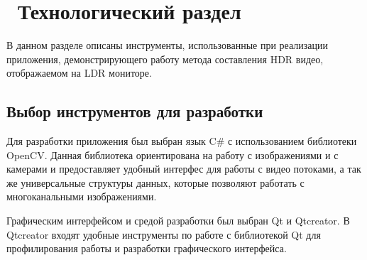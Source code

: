 \chapter{ Технологический раздел}
\label{cha:impl}

В данном разделе описаны инструменты, использованные при реализации приложения, демонстрирующего работу метода составления HDR видео, отображаемом на LDR мониторе.

\section{ Выбор инструментов для разработки}

Для разработки приложения был выбран язык C\# с использованием библиотеки OpenCV. Данная библиотека ориентирована на работу с изображениями и с камерами и предоставляет удобный интерфес для работы с видео потоками, а так же универсальные структуры данных, которые позволяют работать с многоканальными изображениями. 

Графическим интерфейсом и средой разработки был выбран Qt и Qtcreator. В Qtcreator входят удобные инструменты по работе с библиотекой Qt для профилирования работы и разработки графического интерфейса. 
